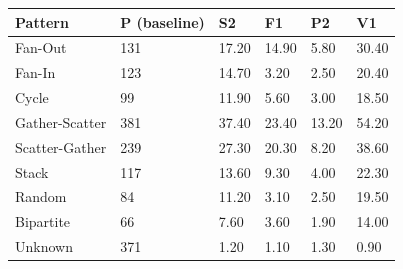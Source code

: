 \begin{tabular}{llllll}
\toprule
Pattern & P (baseline) & S2 & F1 & P2 & V1 \\
\midrule
Fan-Out & 131 & 17.20 & 14.90 & 5.80 & 30.40 \\
Fan-In & 123 & 14.70 & 3.20 & 2.50 & 20.40 \\
Cycle & 99 & 11.90 & 5.60 & 3.00 & 18.50 \\
Gather-Scatter & 381 & 37.40 & 23.40 & 13.20 & 54.20 \\
Scatter-Gather & 239 & 27.30 & 20.30 & 8.20 & 38.60 \\
Stack & 117 & 13.60 & 9.30 & 4.00 & 22.30 \\
Random & 84 & 11.20 & 3.10 & 2.50 & 19.50 \\
Bipartite & 66 & 7.60 & 3.60 & 1.90 & 14.00 \\
Unknown & 371 & 1.20 & 1.10 & 1.30 & 0.90 \\
\bottomrule
\end{tabular}
